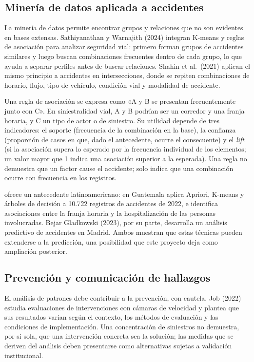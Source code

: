 \documentclass[12pt,letterpaper]{article}
\begin{document}
\hypertarget{mineruxeda-de-datos-aplicada-a-accidentes}{%
\subsection{Minería de datos aplicada a
accidentes}\label{mineruxeda-de-datos-aplicada-a-accidentes}}

La minería de datos permite encontrar grupos y relaciones que no son
evidentes en bases extensas. Sathiyanathan y Warnajith (2024) integran
K-means y reglas de asociación para analizar seguridad vial: primero
forman grupos de accidentes similares y luego buscan combinaciones
frecuentes dentro de cada grupo, lo que ayuda a separar perfiles antes
de buscar relaciones. Shahin et al.~(2021) aplican el mismo principio a
accidentes en intersecciones, donde se repiten combinaciones de
horario, flujo, tipo de vehículo, condición vial y modalidad de
accidente.

Una regla de asociación se expresa como «A y B se presentan
frecuentemente junto con C». En siniestralidad vial, A y B podrían ser
un corredor y una franja horaria, y C un tipo de actor o de siniestro.
Su utilidad depende de tres indicadores: el soporte (frecuencia de la
combinación en la base), la confianza (proporción de casos en que, dado
el antecedente, ocurre el consecuente) y el \emph{lift} (si la
asociación supera lo esperado por la frecuencia individual de los
elementos; un valor mayor que 1 indica una asociación superior a la
esperada). Una regla no demuestra que un factor cause el accidente;
solo indica que una combinación ocurre con frecuencia en los registros.

\citet{davila2024} ofrece un antecedente latinoamericano: en
Guatemala aplica Apriori, K-means y árboles de decisión a 10.722
registros de accidentes de 2022, e identifica asociaciones entre la
franja horaria y la hospitalización de las personas involucradas. Bejar Gladkowski (2023), por su
parte, desarrolla un análisis predictivo de accidentes en Madrid. Ambos
muestran que estas técnicas pueden extenderse a la predicción, una
posibilidad que este proyecto deja como ampliación posterior.

\hypertarget{prevenciuxf3n-y-comunicaciuxf3n-de-hallazgos}{%
\subsection{Prevención y comunicación de
hallazgos}\label{prevenciuxf3n-y-comunicaciuxf3n-de-hallazgos}}

El análisis de patrones debe contribuir a la prevención, con cautela.
Job (2022) estudia evaluaciones de intervenciones con cámaras de
velocidad y plantea que sus resultados varían según el contexto, los
métodos de evaluación y las condiciones de implementación. Una
concentración de siniestros no demuestra, por sí sola, que una
intervención concreta sea la solución; las medidas que se deriven del
análisis deben presentarse como alternativas sujetas a validación
institucional.
\end{document}
